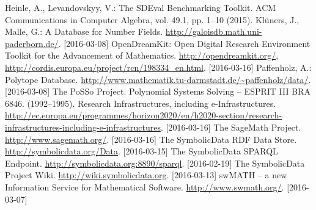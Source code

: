 \documentclass[runningheads,a4paper]{llncs}
\newcommand{\SD}{{\sc Symbo\-lic\-Data}}
\begin{document}
\begin{thebibliography}{4}
 Heinle, A., Levandovskyy, V.: The SDEval Benchmarking
  Toolkit. ACM Communications in Computer Algebra, vol. 49.1, pp. 1--10 (2015).
 Kl\"uners, J., Malle, G.: A Database for Number Fields.
  \url{http://galoisdb.math.uni-paderborn.de/}. [2016-03-08]
 OpenDreamKit: Open Digital Research Environment Toolkit for the
  Advancement of Mathematics. \url{http://opendreamkit.org/},
  \url{http://cordis.europa.eu/project/rcn/198334_en.html}. [2016-03-16]
 Paffenholz, A.: Polytope Database.
  \url{http://www.mathematik.tu-darmstadt.de/~paffenholz/data/}.  [2016-03-08] 
 The PoSSo Project. Polynomial Systems Solving -- ESPRIT III BRA
  6846.  (1992--1995).
 Research Infrastructures, including e-Infrastructures.
  \url{http://ec.europa.eu/programmes/horizon2020/en/h2020-section/research-infrastructures-including-e-infrastructures}. [2016-03-16]
 The SageMath Project.  \url{http://www.sagemath.org/}.
  [2016-03-16]
 The {\SD} RDF Data Store.
  \url{http://symbolicdata.org/Data}.  [2016-03-15]
 The {\SD} SPARQL Endpoint.
  \url{http://symbolicdata.org:8890/sparql}. [2016-02-19]
 The {\SD} Project Wiki.
   \url{http://wiki.symbolicdata.org}. [2016-03-13]
 swMATH -- a new Information Service for Mathematical Software.
  \url{http://www.swmath.org/}. [2016-03-07]
\end{thebibliography}
\end{document}
